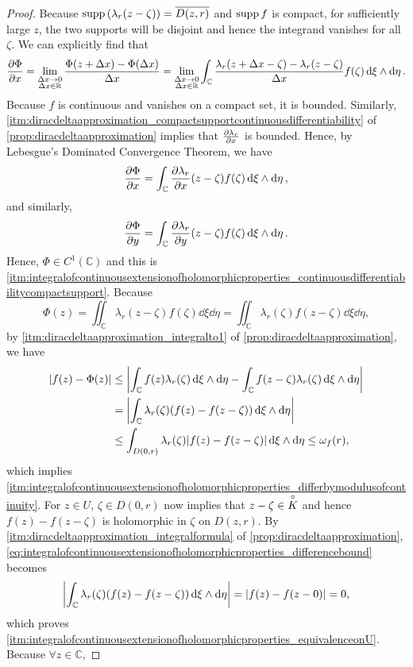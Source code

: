 \begin{proof}
    Because \(\operatorname{supp}\qty(\lambda_r(z-\zeta))=\overline{D(z,r)}\) and \(\operatorname{supp} f\) is compact, for sufficiently large \(z\), the two supports will be disjoint and hence the integrand vanishes for all \(\zeta\). We can explicitly find that \[\pdv{\Phi}{x}=\lim_{\substack{\Delta x\to 0\\\Delta x\in\mathbb{R}}}\frac{\Phi(z+\Delta x)-\Phi(\Delta x)}{\Delta x}=\lim_{\substack{\Delta x\to 0\\\Delta x\in\mathbb{R}}}\int_{\mathbb{C}}\frac{\lambda_r(z+\Delta x-\zeta)-\lambda_r(z-\zeta)}{\Delta x}f(\zeta)\dd{\xi}\wedge\dd{\eta}.\] Because \(f\) is continuous and vanishes on a compact set, it is bounded. Similarly, \cref{itm:diracdeltaapproximation_compactsupportcontinuousdifferentiability} of \cref{prop:diracdeltaapproximation} implies that \(\pdv{\lambda_r}{x}\) is bounded. Hence, by Lebesgue's Dominated Convergence Theorem, we have \[\pdv{\Phi}{x}=\int_{\mathbb{C}}{\pdv{\lambda_r}{x}}(z-\zeta)f(\zeta)\dd{\xi}\wedge\dd{\eta},\] and similarly, \[\pdv{\Phi}{y}=\int_{\mathbb{C}}{\pdv{\lambda_r}{y}}(z-\zeta)f(\zeta)\dd{\xi}\wedge\dd{\eta}.\] Hence, \(\Phi\in C^1(\mathbb{C})\) and this is \cref{itm:integralofcontinuousextensionofholomorphicproperties_continuousdifferentiabilitycompactsupport}. Because \[\Phi(z)=\iint_{\mathbb{C}}\lambda_r(z-\zeta)f(\zeta)\dd{\xi}\dd{\eta}=\iint_{\mathbb{C}}\lambda_r(\zeta)f(z-\zeta)\dd{\xi}\dd{\eta},\] by \cref{itm:diracdeltaapproximation_integralto1} of \cref{prop:diracdeltaapproximation}, we have
    \begin{align}
        \abs{f(z)-\Phi(z)} & \leq\abs{\int_{\mathbb{C}}f(z)\lambda_r(\zeta)\dd{\xi}\wedge\dd{\eta}-\int_{\mathbb{C}}f(z-\zeta)\lambda_r(\zeta)\dd{\xi}\wedge\dd{\eta}}\nonumber                  \\
        & =\abs{\int_{\mathbb{C}}\lambda_r(\zeta)\qty(f(z)-f(z-\zeta))\dd{\xi}\wedge\dd{\eta}}\label{eq:integralofcontinuousextensionofholomorphicproperties_differencebound} \\
        & \leq\int_{D(0,r)}\lambda_r(\zeta)\abs{f(z)-f(z-\zeta)}\dd{\xi}\wedge\dd{\eta}\leq\omega_f(r),\nonumber
    \end{align}
    which implies \cref{itm:integralofcontinuousextensionofholomorphicproperties_differbymodulusofcontinuity}. For \(z\in U\), \(\zeta\in D(0,r)\) now implies that \(z-\zeta\in\overset{\circ}{K}\) and hence \(f(z)-f(z-\zeta)\) is holomorphic in \(\zeta\) on \(D(z,r)\). By \cref{itm:diracdeltaapproximation_integralformula} of \cref{prop:diracdeltaapproximation}, \cref{eq:integralofcontinuousextensionofholomorphicproperties_differencebound} becomes \[\abs{\int_{\mathbb{C}}\lambda_r(\zeta)\qty(f(z)-f(z-\zeta))\dd{\xi}\wedge\dd{\eta}}=\abs{f(z)-f(z-0)}=0,\] which proves \cref{itm:integralofcontinuousextensionofholomorphicproperties_equivalenceonU}. Because \(\forall z\in\mathbb{C}\),

\end{proof}
